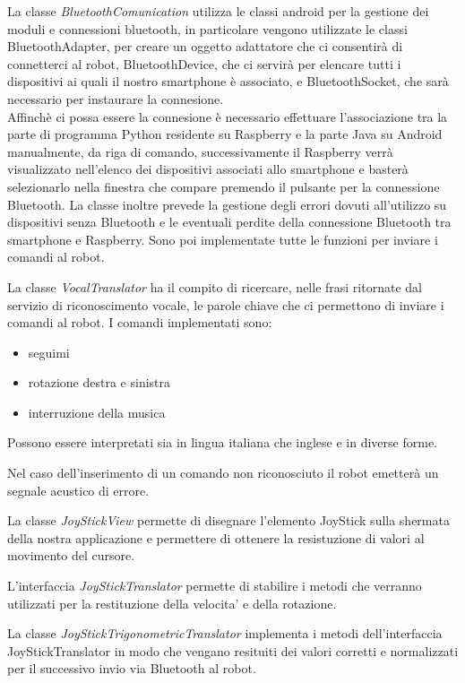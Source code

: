 \documentclass[12pt]{article}
\begin{document}
\medskip

La classe \emph{BluetoothComunication} utilizza le classi android per la gestione dei moduli e connessioni bluetooth, in particolare
vengono utilizzate le classi BluetoothAdapter, per creare un oggetto adattatore che ci consentirà di connetterci al robot, BluetoothDevice, che ci servirà per elencare tutti i dispositivi ai quali il nostro smartphone è associato, e BluetoothSocket, che sarà necessario per instaurare la connesione.\\
Affinchè ci possa essere la connesione è necessario effettuare l'associazione tra la parte di programma Python residente su Raspberry e la parte Java su Android manualmente, da riga di comando, successivamente il Raspberry verrà visualizzato nell'elenco dei dispositivi associati allo smartphone e basterà selezionarlo nella finestra che compare premendo il pulsante per la connessione Bluetooth.
La classe inoltre prevede la gestione degli errori dovuti all'utilizzo su dispositivi senza Bluetooth e le eventuali perdite della connessione Bluetooth tra smartphone e Raspberry. Sono poi implementate tutte le funzioni per inviare i comandi al robot.

\medskip

La classe \emph{VocalTranslator} ha il compito di ricercare, nelle frasi ritornate dal servizio di riconoscimento vocale, le parole chiave che ci permettono di inviare i comandi al robot.
I comandi implementati sono:
\begin{itemize}
\item seguimi
\item rotazione destra e sinistra
\item interruzione della musica
\end{itemize}

Possono essere interpretati sia in lingua italiana che inglese e in diverse forme.

Nel caso dell'inserimento di un comando non riconosciuto il robot emetterà un segnale acustico di errore.

La classe \emph{JoyStickView} permette di disegnare l'elemento JoyStick sulla shermata della nostra applicazione e permettere di ottenere la resistuzione di valori al movimento del cursore.

L'interfaccia \emph{JoyStickTranslator} permette di stabilire i metodi che verranno utilizzati per la restituzione della velocita' e della rotazione.

La classe \emph{JoyStickTrigonometricTranslator} implementa i metodi dell'interfaccia JoyStickTranslator in modo che vengano resituiti dei valori corretti e normalizzati per il successivo invio via Bluetooth al robot.
\end{document}
